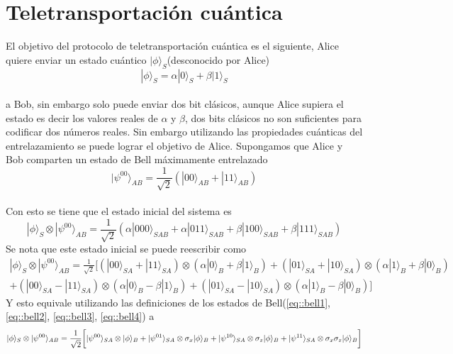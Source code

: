 \documentclass[a4paper]{article}
\begin{document}
\section{Teletransportación cuántica}
El objetivo del protocolo de teletransportación cuántica es el siguiente, Alice quiere enviar un estado cuántico $|\phi\rangle_S$(desconocido por Alice)
\begin{equation}
|\phi\rangle_S=\alpha|0\rangle_S+\beta|1\rangle_S
\end{equation}\\
a Bob, sin embargo solo puede enviar dos bit clásicos, aunque Alice supiera el estado es decir los valores reales de $\alpha$ y $\beta$, dos bits clásicos no son suficientes para codificar dos números reales. Sin embargo utilizando las propiedades cuánticas del entrelazamiento se puede lograr el objetivo de Alice.
Supongamos que Alice y Bob comparten un estado de Bell máximamente entrelazado 
\begin{equation}
|\psi^{00}\rangle_{AB}=\frac{1}{\sqrt{2}}(|00\rangle_{AB}+|11\rangle_{AB})
\end{equation}\\
Con esto se tiene que el estado inicial del sistema es 
\begin{equation}
|\phi\rangle_S\otimes |\psi^{00}\rangle_{AB}=\frac{1}{\sqrt{2}}(\alpha|000\rangle_{SAB}+\alpha|011\rangle_{SAB}+\beta|100\rangle_{SAB}+\beta|111\rangle_{SAB})
\end{equation}
Se nota que este estado inicial se puede reescribir como
\begin{equation}
\begin{split}
|\phi\rangle_S\otimes |\psi^{00}\rangle_{AB}=\frac{1}{\sqrt{2}}\bigg[ (|00\rangle_{SA}+|11\rangle_{SA})\otimes(\alpha|0\rangle_B+\beta|1\rangle_B)+(|01\rangle_{SA}+|10\rangle_{SA})\otimes(\alpha|1\rangle_B+\beta|0\rangle_B) \\
+(|00\rangle_{SA}-|11\rangle_{SA})\otimes(\alpha|0\rangle_B-\beta|1\rangle_B)+(|01\rangle_{SA}-|10\rangle_{SA})\otimes(\alpha|1\rangle_B-\beta|0\rangle_B)\bigg]
\end{split}
\end{equation}
Y esto equivale utilizando las definiciones de los estados de Bell(\ref{eq::bell1}, \ref{eq::bell2}, \ref{eq::bell3}, \ref{eq::bell4}) a 
\begin{equation}
|\phi\rangle_S\otimes |\psi^{00}\rangle_{\small{AB}}=\frac{1}{\sqrt{2}}\bigg[|\psi^{00}\rangle_{SA}\otimes|\phi\rangle_B+|\psi^{01}\rangle_{SA}\otimes\sigma_x|\phi\rangle_B +|\psi^{10}\rangle_{SA}\otimes\sigma_z|\phi\rangle_B+|\psi^{11}\rangle_{SA}\otimes\sigma_x\sigma_z|\phi\rangle_B \bigg]
\end{equation}\\
\end{document}
